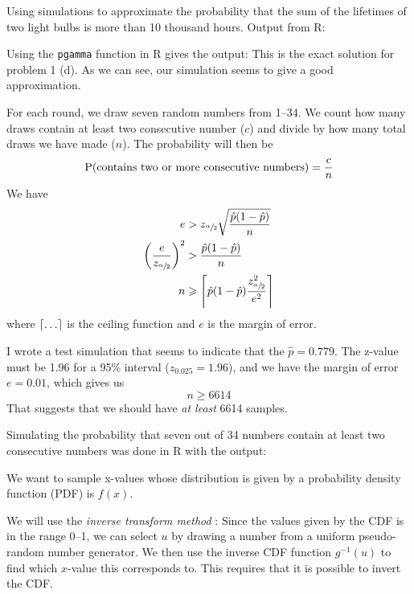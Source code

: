 \documentclass[a4paper,english,12pt]{article}
\begin{document}
Using simulations to approximate the probability that the sum of the lifetimes
of two light bulbs is more than 10 thousand hours. Output from R:

Using the \texttt{pgamma} function in R gives the output:
This is the exact solution for problem 1 (d). As we can see, our simulation
seems to give a good approximation.

For each round, we draw seven random numbers from 1--34. We count how many
draws contain at least two consecutive number ($c$) and divide by how many
total draws we have made ($n$). The probability will then be
\[
  \Prb(\text{contains two or more consecutive numbers}) = \frac{c}{n}
\]
We have
\begin{align*}
  e &> z_{\sfrac{\alpha}{2}}\sqrt{\frac{\hat{p}(1-\hat{p})}{n}} \\
  \left(\frac{e}{z_{\sfrac{\alpha}{2}}}\right)^2 &> \frac{\hat{p}(1-\hat{p})}{n} \\
  n &\geqslant \ceil*{ \hat{p}(1-\hat{p}) \frac{z_{\sfrac{\alpha}{2}}^2}{e^2} }
\end{align*}
where $\ceil{\dots}$ is the ceiling function and $e$ is the margin of
error.

I wrote a test simulation that seems to indicate that the $\hat{p} = 0.779$.
The z-value must be 1.96 for a 95\%{} interval ($z_{0.025} = 1.96$), and we
have the margin of error $e = 0.01$, which gives us
\[
  n \geqslant 6614
\]
That suggests that we should have \textit{at least} 6614 samples.

Simulating the probability that seven out of 34 numbers contain at least two
consecutive numbers was done in R with the output:

\label{problem:3a}
We want to sample x-values whose distribution is given by a probability density
function (PDF) is $f(x)$.

We will use the \textit{inverse transform method}
\cite{wiki:inverse.transform.method}: Since the values given by the CDF is in
the range 0--1, we can select $u$ by drawing a number from a uniform
pseudo-random number generator. We then use the inverse CDF function
$g^{-1}(u)$ to find which $x$-value this corresponds to. This requires that it
is possible to invert the CDF.
\end{document}
